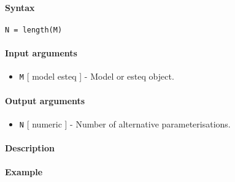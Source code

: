 


	\paragraph{Syntax}

\begin{verbatim}
N = length(M)
\end{verbatim}

\paragraph{Input arguments}

\begin{itemize}
\itemsep1pt\parskip0pt
\item
  \texttt{M} {[} model \textbar{} esteq {]} - Model or esteq object.
\end{itemize}

\paragraph{Output arguments}

\begin{itemize}
\itemsep1pt\parskip0pt
\item
  \texttt{N} {[} numeric {]} - Number of alternative parameterisations.
\end{itemize}

\paragraph{Description}

\paragraph{Example}


